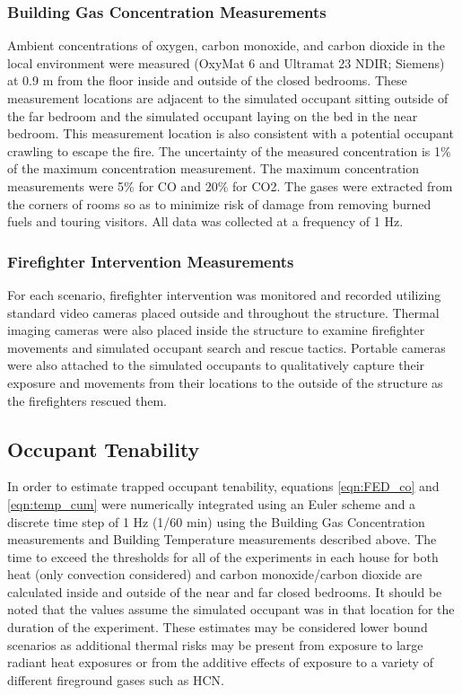 \documentclass[12pt,oneside]{article}
\begin{document}
\subsubsection{Building Gas Concentration Measurements}
Ambient concentrations of oxygen, carbon monoxide, and carbon dioxide in the local environment were measured (OxyMat 6 and Ultramat 23 NDIR; Siemens) at 0.9 m from the floor inside and outside of the closed bedrooms.   These measurement locations are adjacent to the simulated occupant sitting outside of the far bedroom and the simulated occupant laying on the bed in the near bedroom.  This measurement location is also consistent with a potential occupant crawling to escape the fire.  The uncertainty of the measured concentration is 1\% of the maximum concentration measurement. The maximum concentration measurements were 5\% for CO and 20\% for CO2. The gases were extracted from the corners of rooms so as to minimize risk of damage from removing burned fuels and touring visitors. All data was collected at a frequency of 1 Hz. 

\subsubsection{Firefighter Intervention Measurements}
For each scenario, firefighter intervention was monitored and recorded utilizing standard video cameras placed outside and throughout the structure.  Thermal imaging cameras were also placed inside the structure to examine firefighter movements and simulated occupant search and rescue tactics.  Portable cameras were also attached to the simulated occupants to qualitatively capture their exposure and movements from their locations to the outside of the structure as the firefighters rescued them.

\subsection{Occupant Tenability}

In order to estimate trapped occupant tenability, equations \ref{eqn:FED_co} and \ref{eqn:temp_cum}  were numerically integrated using an Euler scheme and a discrete time step of 1 Hz (1/60 min) using the Building Gas Concentration measurements and Building Temperature measurements described above. The time to exceed the thresholds for all of the experiments in each house for both heat (only convection considered) and carbon monoxide/carbon dioxide are calculated inside and outside of the near and far closed bedrooms.  It should be noted that the values assume the simulated occupant was in that location for the duration of the experiment. These estimates may be considered lower bound scenarios as additional thermal risks may be present from exposure to large radiant heat exposures or from the additive effects of exposure to a variety of different fireground gases such as HCN.
\end{document}
